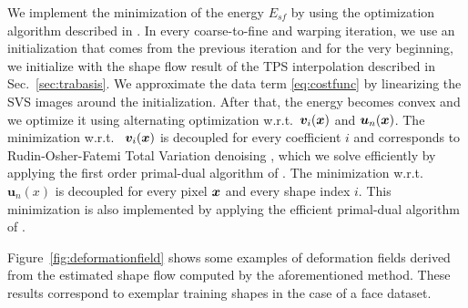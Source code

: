 We implement the minimization of the energy $E_{sf}$ by using the optimization algorithm described in \cite{Garg:2013hu}. In every coarse-to-fine and warping iteration, we use an initialization that comes from the previous iteration and for the very beginning, we initialize with the shape flow result of the TPS interpolation described in Sec.~\ref{sec:trabasis}. We approximate the data term \eqref{eq:costfunc} by linearizing the SVS images around the initialization. After that, the energy becomes convex and we optimize it using alternating optimization w.r.t.~$\bm{v}_i(\boldsymbol{x})$ and $\bm{u}_n(\boldsymbol{x})$. The minimization w.r.t.~
$\bm{v}_i(\boldsymbol{x})$ is decoupled for every coefficient $i$ and corresponds to Rudin-Osher-Fatemi Total Variation denoising \cite{rudin92}, which we solve efficiently by applying the first order primal-dual algorithm of \cite{Chambolle:Pock:JMIV2011}. The minimization w.r.t.~
$\bm{u}_n(x)$ is decoupled for every pixel $\boldsymbol{x}$ and every shape index $i$. This minimization is also implemented by applying the efficient primal-dual algorithm of \cite{Chambolle:Pock:JMIV2011}.



Figure~\ref{fig:deformationfield} shows some examples of deformation fields derived from the estimated shape flow computed by the aforementioned method. These results correspond to exemplar training shapes in the case of a face dataset.


